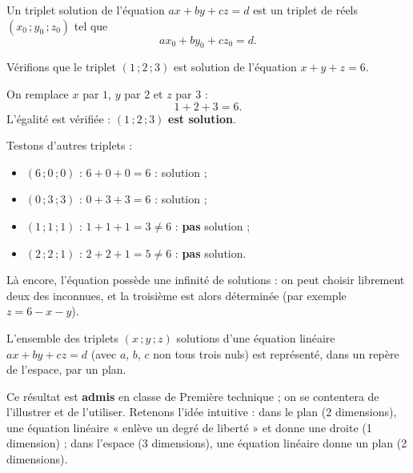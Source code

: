\documentclass[11pt]{article}
\newcommand{\cle}[1]{{\popxbold\color{popdark}#1}}
\begin{document}
\begin{definition}
Un \cle{triplet solution} de l'équation $ax + by + cz = d$ est un triplet de réels $(x_0 \,; y_0 \,; z_0)$ tel que
\[ a x_0 + b y_0 + c z_0 = d. \]
\end{definition}

\begin{exemplebox}
Vérifions que le triplet $(1 \,; 2 \,; 3)$ est solution de l'équation $x + y + z = 6$.

On remplace $x$ par $1$, $y$ par $2$ et $z$ par $3$ :
\[ 1 + 2 + 3 = 6. \]
L'égalité est vérifiée : $(1 \,; 2 \,; 3)$ \textbf{est solution}.

Testons d'autres triplets :
\begin{itemize}
\item $(6 \,; 0 \,; 0)$ : $6 + 0 + 0 = 6$ : solution ;
\item $(0 \,; 3 \,; 3)$ : $0 + 3 + 3 = 6$ : solution ;
\item $(1 \,; 1 \,; 1)$ : $1 + 1 + 1 = 3 \neq 6$ : \textbf{pas} solution ;
\item $(2 \,; 2 \,; 1)$ : $2 + 2 + 1 = 5 \neq 6$ : \textbf{pas} solution.
\end{itemize}
Là encore, l'équation possède une infinité de solutions : on peut choisir librement deux des inconnues, et la troisième est alors déterminée (par exemple $z = 6 - x - y$).
\end{exemplebox}

\begin{propriete}
L'ensemble des triplets $(x \,; y \,; z)$ solutions d'une équation linéaire $ax + by + cz = d$ (avec $a$, $b$, $c$ non tous trois nuls) est représenté, dans un repère de l'espace, par un \cle{plan}.

Ce résultat est \textbf{admis} en classe de Première technique ; on se contentera de l'illustrer et de l'utiliser. Retenons l'idée intuitive : dans le plan (2 dimensions), une équation linéaire « enlève un degré de liberté » et donne une droite (1 dimension) ; dans l'espace (3 dimensions), une équation linéaire donne un plan (2 dimensions).
\end{propriete}
\end{document}
